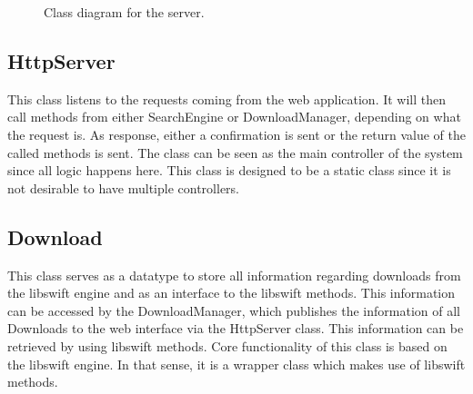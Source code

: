 \begin{center}
\begin{figure}[h!]
\label{fig:class_server}
\caption{Class diagram for the server.}
\end{figure}
\end{center}
\clearpage

\subsection{HttpServer}
This class listens to the requests coming from the web application.
It will then call methods from either SearchEngine or DownloadManager, depending on what the request is. As response, either a confirmation
is sent or the return value of the called methods is sent. The class can be seen as the main controller of the system
since all logic happens here. This class is designed to be a static class since it is not desirable to have multiple controllers.

\subsection{Download}
This class serves as a datatype to store all information regarding downloads from the libswift engine and as an interface to the libswift methods.
This information can be accessed by the DownloadManager, which publishes the information of all Downloads to the web interface via
the HttpServer class. This information can be retrieved by using libswift methods. Core functionality of this class is based on the libswift engine.
In that sense, it is a wrapper class which makes use of libswift methods.

